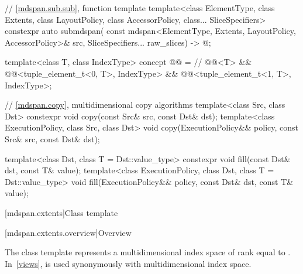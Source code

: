 \begin{codeblock}
{  // \ref{mdspan.sub.sub},  function template
  template<class ElementType, class Extents, class LayoutPolicy,
           class AccessorPolicy, class... SliceSpecifiers>
    constexpr auto submdspan(
      const mdspan<ElementType, Extents, LayoutPolicy, AccessorPolicy>& src,
      SliceSpecifiers... raw_slices) -> @\seebelow@;

  template<class T, class IndexType>
    concept @@ =               // \expos
      @@<T> &&
      @@<tuple_element_t<0, T>, IndexType> &&
      @@<tuple_element_t<1, T>, IndexType>;

  // \ref{mdspan.copy}, multidimensional copy algorithms
  template<class Src, class Dst>
    constexpr void copy(const Src& src, const Dst& dst);
  template<class ExecutionPolicy, class Src, class Dst>
    void copy(ExecutionPolicy&& policy, const Src& src, const Dst& dst);

  template<class Dst, class T = Dst::value_type>
    constexpr void fill(const Dst& dst, const T& value);
  template<class ExecutionPolicy, class Dst, class T = Dst::value_type>
    void fill(ExecutionPolicy&& policy, const Dst& dst, const T& value);
}
\end{codeblock}

[mdspan.extents]{Class template }

[mdspan.extents.overview]{Overview}

The class template  represents
a multidimensional index space of rank equal to .
In~\ref{views},
 is used synonymously with multidimensional index space.

